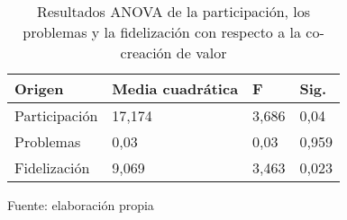 \begin{table}[h]
    \caption {Resultados ANOVA de la participación, los problemas y la fidelización con respecto a la co-creación de valor}
	\label{tab:anovaPPF}
	\setlength\extrarowheight{5pt}
	
	\begin{tabular}{p{2.9cm} p{2.9cm} p{2.9cm} p{2.9cm}}
	\toprule
	Origen	& Media cuadrática	& F & Sig. \\
	\midrule
	Participación	& 17,174	& 3,686	& 0,04 \\
	Problemas	 	& 0,03		& 0,03	& 0,959 \\
	Fidelización	& 9,069		& 3,463	& 0,023 \\
	\bottomrule
	\end{tabular}
	
	\center
	\footnotesize
	Fuente: elaboración propia
\end{table}
